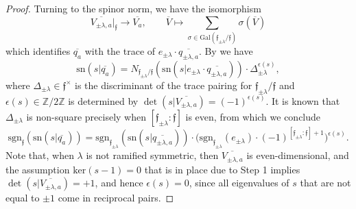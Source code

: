 \documentclass{article}
\def\tx#1{\textrm{#1}}
\def\Z{\mathbb{Z}}
\def\ol#1{\overline{#1}}
\theoremstyle{definition}
\numberwithin{equation}{subsection}
\renewcommand{\-}{\hyp{}}
\newcommand{\rf}{\mathfrak{f}}
\begin{document}
\begin{proof}
	Turning to the spinor norm, we have the isomorphism
	\[ \ol{V_{\pm\lambda,a}}|_{\rf} \to \ol{V_a},\qquad \ol{V} \mapsto  \sum_{\sigma \in \tx{Gal}(\rf_{\pm\lambda}/\rf)} \sigma(\ol{V}) \]
	which identifies $\ol{q_a}$ with the trace of $e_{\pm\lambda}\cdot\ol{q_{\pm\lambda,a}}$. By \cite[Chapter 9, \S3, Example 3.7]{Sch85} we have
	\[ \tx{sn}(s|\ol{q_a}) = N_{\rf_{\pm\lambda}/\rf}(\tx{sn}(s|e_{\pm\lambda}\cdot \ol{q_{\pm\lambda,a}})) \cdot \Delta_{\pm\lambda}^{\epsilon(s)}, \]
	where $\Delta_{\pm\lambda} \in \rf^\times$ is the discriminant of the trace pairing for $\rf_{\pm\lambda}/\rf$ and $\epsilon(s) \in \Z/2\Z$ is determined by $\det(s|\ol{V_{\pm\lambda,a}})=(-1)^{\epsilon(s)}$. It is known that $\Delta_{\pm\lambda}$ is non-square precisely when $[\rf_{\pm\lambda}:\rf]$ is even, from which we conclude
	\[ \tx{sgn}_\rf(\tx{sn}(s|\ol{q_a})) = \tx{sgn}_{\rf_{\pm\lambda}}(\tx{sn}(s|\ol{q_{\pm\lambda,a}})) \cdot \Big(\tx{sgn}_{\rf_{\pm\lambda}}(e_{\pm\lambda})\cdot (-1)^{[\rf_{\pm\lambda}:\rf]+1}\Big)^{\epsilon(s)}. \]
	Note that, when $\lambda$ is not ramified symmetric, then $\ol{V_{\pm\lambda,a}}$ is even-dimensional, and the assumption $\tx{ker}(s-1)=0$ that is in place due to Step 1 implies $\det(s|\ol{V_{\pm\lambda,a}})=+1$, and hence $\epsilon(s)=0$, since all eigenvalues of $s$ that are not equal to $\pm 1$ come in reciprocal pairs.


\end{proof}
\end{document}
